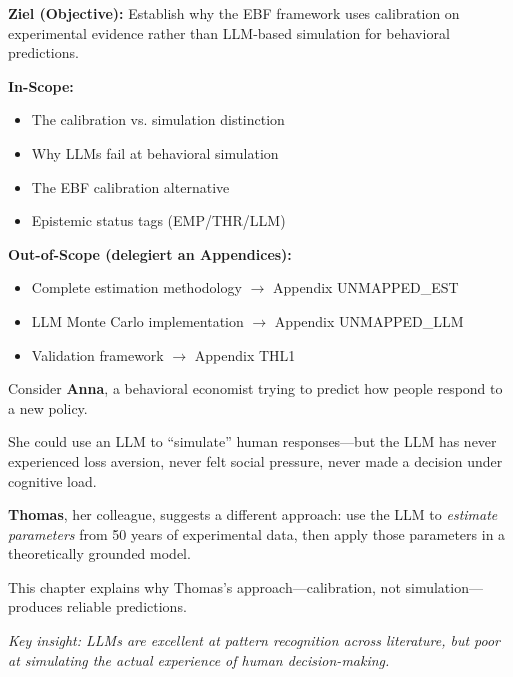 \begin{tcolorbox}[
    colback=purple!5!white,
    colframe=purple!75!black,
    title={\textbf{Chapter Scope: Ziel / In-Scope / Out-of-Scope}},
    fonttitle=\bfseries
]

\textbf{Ziel (Objective):}
Establish why the EBF framework uses calibration on experimental evidence rather than LLM-based simulation for behavioral predictions.

\vspace{0.3cm}
\textbf{In-Scope:}
\begin{itemize}[nosep]
    \item The calibration vs. simulation distinction
    \item Why LLMs fail at behavioral simulation
    \item The EBF calibration alternative
    \item Epistemic status tags (EMP/THR/LLM)
\end{itemize}

\vspace{0.3cm}
\textbf{Out-of-Scope (delegiert an Appendices):}
\begin{itemize}[nosep]
    \item Complete estimation methodology $\rightarrow$ Appendix UNMAPPED_EST
    \item LLM Monte Carlo implementation $\rightarrow$ Appendix UNMAPPED_LLM
    \item Validation framework $\rightarrow$ Appendix THL1
\end{itemize}

\end{tcolorbox}

\begin{tcolorbox}[
    colback=blue!5!white,
    colframe=blue!75!black,
    title={\textbf{Intuition: Why Calibration Beats Simulation}},
    fonttitle=\bfseries
]
Consider \textbf{Anna}, a behavioral economist trying to predict how people respond to a new policy.

She could use an LLM to ``simulate'' human responses---but the LLM has never experienced loss aversion, never felt social pressure, never made a decision under cognitive load.

\textbf{Thomas}, her colleague, suggests a different approach: use the LLM to \emph{estimate parameters} from 50 years of experimental data, then apply those parameters in a theoretically grounded model.

This chapter explains why Thomas's approach---calibration, not simulation---produces reliable predictions.

\medskip
\textit{Key insight: LLMs are excellent at pattern recognition across literature, but poor at simulating the actual experience of human decision-making.}
\end{tcolorbox}

